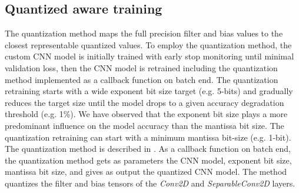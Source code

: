 \subsection{\textbf{Quantized aware training}}
The quantization method maps the full precision filter and bias values to the closest representable quantized values. To employ the quantization method, the custom CNN model is initially trained with early stop monitoring until minimal validation loss, then the CNN model is retrained including the quantization method implemented as a callback function on batch end. The quantization retraining starts with a wide exponent bit size target (e.g. 5-bits) and gradually reduces the target size until the model drops to a given accuracy degradation threshold (e.g. 1\%). We have observed that the exponent bit size plays a more predominant influence on the model accuracy than the mantissa bit size. The quantization retraining can start with a minimum mantissa bit-size (e.g. 1-bit). The quantization method is described in . As a callback function on batch end, the quantization method gets as parameters the CNN model, exponent bit size, mantissa bit size, and gives as output the quantized CNN model. The method quantizes the filter and bias tensors of the \emph{Conv2D} and \emph{SeparableConv2D} layers.

